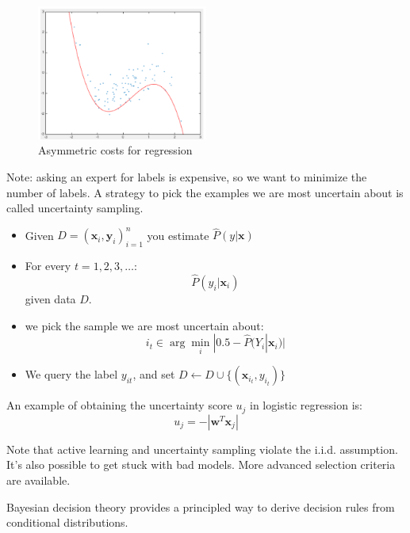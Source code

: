 \documentclass[a4paper,10pt,twoside]{article}
\begin{document}
\begin{figure}
  \centering
  \includegraphics[width=0.5\textwidth]{figures/asymmetric_cost_regression.png}
  \caption{Asymmetric costs for regression}
  \label{fig:asymmetric_costs_for_regression}
\end{figure}

Note: asking an expert for labels is expensive, so we want to minimize the number of labels. A strategy to pick the examples we are most uncertain about is called uncertainty sampling.

\begin{itemize}
\item Given $D={(\mathbf{x}_i, \mathbf{y}_i)}^{n}_{i=1}$ you estimate $\hat{P}(y|\mathbf{x})$
\item For every $t=1,2,3,\ldots$:
  \begin{equation*}
    \hat{P}(y_i|\mathbf{x}_i)
  \end{equation*}
  given data $D$.
\item we pick the sample we are most uncertain about:
  \begin{equation*}
    i_t\in\arg\min_i|0.5-\hat{P}(Y_i|\mathbf{x}_i)|
  \end{equation*}
\item We query the label $y_{it}$, and set $D\leftarrow D\cup\{(\mathbf{x}_{i_t},y_{i_t})\}$
\end{itemize}

An example of obtaining the uncertainty score $u_j$ in logistic regression is:
\begin{equation*}
  u_j=-|\mathbf{w}^T\mathbf{x}_j|
\end{equation*}

Note that active learning and uncertainty sampling violate the i.i.d. assumption. It's also possible to get stuck with bad models. More advanced selection criteria are available.

Bayesian decision theory provides a principled way to derive decision rules from conditional distributions.
\end{document}
